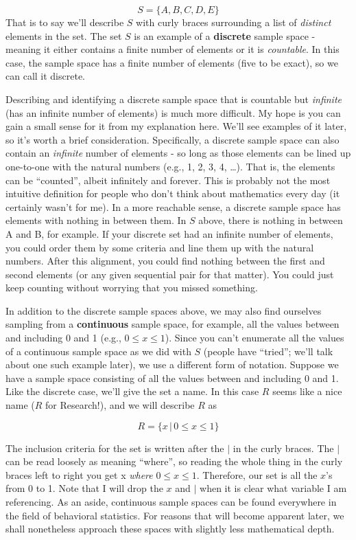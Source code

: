 \documentclass[
]{book}
\newcounter{none} %
\theoremstyle{definition}
\theoremstyle{definition}
\theoremstyle{definition}
\theoremstyle{definition}
\theoremstyle{remark}
\begin{document}
\[
S = \{A, B, C, D, E\}
\label{eq:discreteset}
\]
That is to say we'll describe \(S\) with curly braces surrounding a list of \emph{distinct} elements in the set. The set \(S\) is an example of a \textbf{discrete} sample space - meaning it either contains a finite number of elements or it is \emph{countable}. In this case, the sample space has a finite number of elements (five to be exact), so we can call it discrete.

Describing and identifying a discrete sample space that is countable but \emph{infinite} (has an infinite number of elements) is much more difficult. My hope is you can gain a small sense for it from my explanation here. We'll see examples of it later, so it's worth a brief consideration. Specifically, a discrete sample space can also contain an \emph{infinite} number of elements - so long as those elements can be lined up one-to-one with the natural numbers (e.g., 1, 2, 3, 4, \ldots). That is, the elements can be ``counted'', albeit infinitely and forever. This is probably not the most intuitive definition for people who don't think about mathematics every day (it certainly wasn't for me). In a more reachable sense, a discrete sample space has elements with nothing in between them. In \(S\) above, there is nothing in between A and B, for example. If your discrete set had an infinite number of elements, you could order them by some criteria and line them up with the natural numbers. After this alignment, you could find nothing between the first and second elements (or any given sequential pair for that matter). You could just keep counting without worrying that you missed something.

In addition to the discrete sample spaces above, we may also find ourselves sampling from a \textbf{continuous} sample space, for example, all the values between and including 0 and 1 (e.g., \(0 \leq x \leq 1\)). Since you can't enumerate all the values of a continuous sample space as we did with \(S\) (people have ``tried''; we'll talk about one such example later), we use a different form of notation. Suppose we have a sample space consisting of all the values between and including 0 and 1. Like the discrete case, we'll give the set a name. In this case \(R\) seems like a nice name (\(R\) for Research!), and we will describe \(R\) as

\[
R = \{x\, | \, 0 \leq x \leq 1 \}
\label{eq:continuousset}
\]

The inclusion criteria for the set is written after the \(|\) in the curly braces. The \(|\) can be read loosely as meaning ``where'', so reading the whole thing in the curly braces left to right you get x \emph{where} \(0 \leq x \leq 1\). Therefore, our set is all the \(x\)'s from 0 to 1. Note that I will drop the \(x\) and \(|\) when it is clear what variable I am referencing. As an aside, continuous sample spaces can be found everywhere in the field of behavioral statistics. For reasons that will become apparent later, we shall nonetheless approach these spaces with slightly less mathematical depth.
\end{document}
